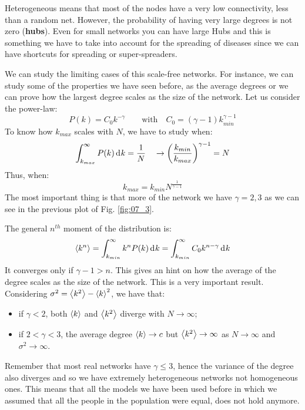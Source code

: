\documentclass[../main/main.tex]{subfiles}
\begin{document}
Heterogeneous means that most of the nodes have a very low connectivity, less than a random net. However, the probability of having very large degrees is not zero (\textbf{hubs}). Even for small networks you can have large Hubs and this is something we have to take into account for the spreading of diseases since we can have shortcuts for spreading or super-spreaders.

We can study the limiting cases of this scale-free networks. For instance, we can study some of the properties we have seen before, as the average degrees or we can prove how the largest degree scales as the size of the network. Let us consider the power-law:
\begin{equation}
  P(k) = C_0 k^{-\gamma } \qquad \text{with} \quad C_0 = (\gamma -1  ) k_{min}^{\gamma -1 }
\end{equation}
To know how \( k_{max} \) scales with \( N \), we have to study when:
\begin{equation*}
  \int_{k_{max}}^{\infty } P(k) \dd[]{k}  = \frac{1}{N} \quad \rightarrow  \qty(\frac{k_{min}}{k_{max}})^{\gamma -1 } = N
\end{equation*}
Thus, when:
\begin{equation}
  k_{max} = k_{min} N^{\frac{1}{\gamma -1 }}
\end{equation}
The most important thing is that more of the network we have \( \gamma = 2,3  \) as we can see in the previous plot of Fig. \ref{fig:07_3}.

The general \( n^{th} \) moment of the distribution is:
\begin{equation}
  \expval{k^n} = \int_{k_{min}}^{\infty } k^n P(k) \dd[]{k} = \int_{k_{min}}^{\infty }  C_0 k^{n- \gamma  }\dd[]{k}
\end{equation}
It converges only if \( \gamma -1 > n  \). This gives an hint on how the average of the degree scales as the size of the network. This is a very important result. Considering \( \sigma ^2  = \expval{k^2} - \expval{k}^2  \), we have that:
\begin{itemize}
\item if \( \gamma <2  \), both \( \expval{k}  \) and \( \expval{k^2}  \) diverge with \( N \rightarrow  \infty  \);

\item if \( 2 < \gamma < 3  \), the average degree \( \expval{k}  \rightarrow c \) but \( \expval{k^2}  \rightarrow \infty \) as \( N \rightarrow  \infty  \) and \( \sigma ^2 \rightarrow \infty  \).
\end{itemize}
Remember that most real networks have \( \gamma \le 3 \), hence the variance of the degree also diverges and so we have extremely heterogeneous networks not homogeneous ones.
This means that all the models we have been used before in which we assumed that all the people in the population were equal, does not hold anymore.
\end{document}
